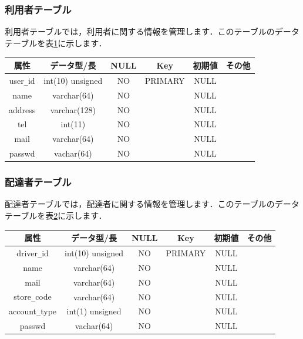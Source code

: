 \documentclass[a4j,titlepage]{jarticle}
\begin{document}
\subsubsection{利用者テーブル}
利用者テーブルでは，利用者に関する情報を管理します．このテーブルのデータテーブルを表\ref{userTable}に示します．
\begin{table}[htb]
  \label{userTable}
  \begin{center}
    \begin{tabular}{|c|c|c|c|c|c|} \hline
      属性 & データ型/長 & NULL & Key & 初期値 & その他 \\ \hline \hline
      user\verb|_|id & int(10) unsigned & NO & PRIMARY & NULL & \\ \hline
      name & varchar(64) & NO &   & NULL & \\ \hline
      address & varchar(128) & NO &   & NULL & \\ \hline
      tel & int(11) & NO &   & NULL & \\ \hline
      mail & varchar(64) & NO &   & NULL & \\ \hline
      passwd & vachar(64) & NO &   & NULL & \\ \hline
    \end{tabular}
  \end{center}
\end{table}

\subsubsection{配達者テーブル}
配達者テーブルでは，配達者に関する情報を管理します．このテーブルのデータテーブルを表\ref{driverTable}に示します．
\begin{table}[htb]
  \label{driverTable}
  \begin{center}
    \begin{tabular}{|c|c|c|c|c|c|} \hline
      属性 & データ型/長 & NULL & Key & 初期値 & その他 \\ \hline \hline
      driver\verb|_|id & int(10) unsigned & NO & PRIMARY & NULL & \\ \hline
      name & varchar(64) & NO &   & NULL & \\ \hline
      mail & varchar(64) & NO &   & NULL & \\ \hline
      store\verb|_|code & varchar(64) & NO &   & NULL & \\ \hline
      account\verb|_|type & int(1) unsigned & NO &   & NULL & \\ \hline
      passwd & vachar(64) & NO &   & NULL & \\ \hline
    \end{tabular}
  \end{center}
\end{table}
\end{document}
